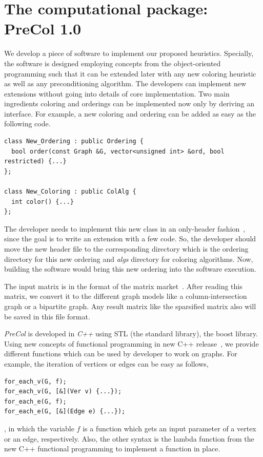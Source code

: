 \documentclass[12pt, twoside,a4paper,toc=bibliography]{scrbook}
\begin{document}
\section{The computational package: PreCol 1.0}
\label{s.extend}
We develop a piece of software to implement our proposed heuristics.
Specially, the software is designed employing concepts from the object-oriented programming
such that it can be extended later with any new coloring heuristic as well as any preconditioning algorithm.
The developers can implement new extensions without going into details of core implementation.
Two main ingredients coloring and orderings can be implemented now only by deriving an interface.
For example, a new coloring and ordering can be added as easy as the following code.
\begin{lstlisting}
class New_Ordering : public Ordering {
  bool order(const Graph &G, vector<unsigned int> &ord, bool restricted) {...}
};

class New_Coloring : public ColAlg {
  int color() {...}
};
\end{lstlisting}

The developer needs to implement this new class in an only-header fashion~\cite{headeronly},
since the goal is to write an extension with a few code. So, the developer should
move the new header file to the corresponding directory which is the ordering directory
for this new ordering and \textit{algs} directory for coloring algorithms.
Now, building the software would bring this new ordering into the software execution.

The input matrix is in the format of the matrix market~\cite{matrix-market}. 
After reading this matrix, we convert it to the different graph models 
like a column-intersection graph or a bipartite graph. 
Any result matrix like the sparsified matrix also will be saved in this file format.

\textit{PreCol} is developed in \textit{C++} using STL (the standard library),
the boost library\cite{boost}.
Using new concepts of functional programming
in new C++ release~\cite{Sutherland2015}, we provide different functions which can be used
by developer to work on graphs. For example, the iteration of vertices
or edges can be easy as follows,
\begin{lstlisting}
for_each_v(G, f);
for_each_v(G, [&](Ver v) {...});
for_each_e(G, f);
for_each_e(G, [&](Edge e) {...});
\end{lstlisting}
, in which the variable $f$ is a function which gets an input parameter
of a vertex or an edge, respectively.
Also, the other syntax is the lambda function
from the new C++ functional programming to implement a function in place.
\end{document}
